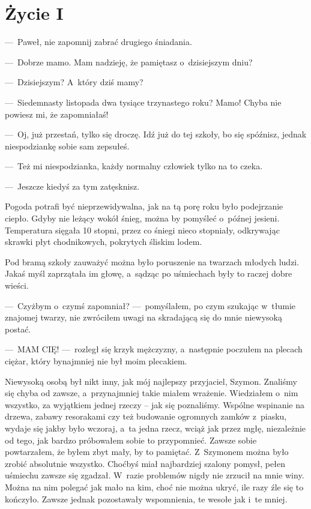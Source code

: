 \chapter{Życie I}

---~Paweł, nie zapomnij zabrać drugiego śniadania.

---~Dobrze mamo. Mam nadzieję, że pamiętasz o~dzisiejszym dniu?

---~Dzisiejszym? A~który dziś mamy?

---~Siedemnasty listopada dwa tysiące trzynastego roku? Mamo! Chyba nie powiesz mi, że zapomniałaś!

---~Oj, już przestań, tylko się droczę. Idź już do tej szkoły, bo się spóźnisz, jednak niespodziankę sobie sam zepsułeś.

---~Też mi niespodzianka, każdy normalny człowiek tylko na to czeka.

---~Jeszcze kiedyś za tym zatęsknisz.

\paraSep

Pogoda potrafi być nieprzewidywalna, jak na tą porę roku było podejrzanie ciepło. Gdyby nie leżący wokół śnieg, można by pomyśleć o~późnej jesieni. Temperatura sięgała 10 stopni, przez co śniegi nieco stopniały, odkrywając skrawki płyt chodnikowych, pokrytych śliskim lodem.

Pod bramą szkoły zauważyć można było poruszenie na twarzach młodych ludzi. Jakaś myśl zaprzątała im głowę, a~sądząc po uśmiechach były to raczej dobre wieści. 

---~Czyżbym o~czymś zapomniał? ---~pomyślałem, po czym szukając w~tłumie znajomej twarzy, nie zwróciłem uwagi na skradającą się do mnie niewysoką postać.

---~MAM CIĘ! ---~rozległ się krzyk mężczyzny, a~następnie poczułem na plecach ciężar, który bynajmniej nie był moim plecakiem.

Niewysoką osobą był nikt inny, jak mój najlepszy przyjaciel, Szymon. Znaliśmy się chyba od zawsze, a~przynajmniej takie miałem wrażenie. Wiedziałem o~nim wszystko, za wyjątkiem jednej rzeczy -- jak się poznaliśmy. Wspólne wspinanie na drzewa, zabawy resorakami czy też budowanie ogromnych zamków z~piasku, wydaje się jakby było wczoraj, a~ta jedna rzecz, wciąż jak przez mgłę, niezależnie od tego, jak bardzo próbowałem sobie to przypomnieć. Zawsze sobie powtarzałem, że byłem zbyt mały, by to pamiętać. Z~Szymonem można było zrobić absolutnie wszystko. Choćbyś miał najbardziej szalony pomysł, pełen uśmiechu zawsze się zgadzał. W~razie problemów nigdy nie zrzucił na mnie winy. Można na nim polegać jak mało na kim, choć nie można ukryć, ile razy źle się to kończyło. Zawsze jednak pozostawały wspomnienia, te wesołe jak i~te mniej.

